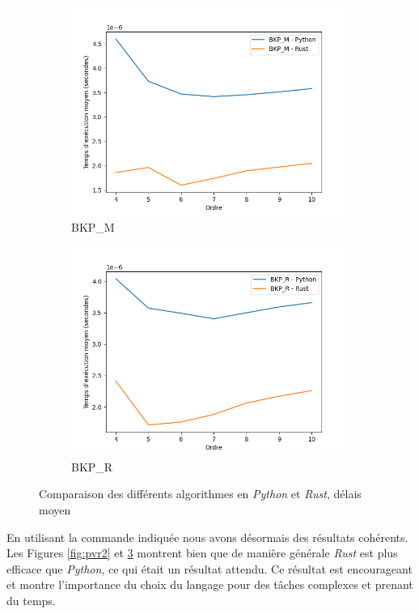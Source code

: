 \documentclass[12pt,a4paper]{article}
\begin{document}
\begin{figure}[ht]
\begin{subfigure}[b]{0.24\textwidth}
    \includegraphics[width=\textwidth]{images/delay_new_pyrust_BKP_M_plot.png}
  \caption{BKP\_M}%
  \label{subfig:pr2_delay_bkp_m}
  \end{subfigure}
  \begin{subfigure}[b]{0.24\textwidth}
    \includegraphics[width=\textwidth]{images/delay_new_pyrust_BKP_R_plot.png}
  \caption{BKP\_R}%
  \label{subfig:pr2_delay_bkp_r}
  \end{subfigure}
  \caption{Comparaison des différents algorithmes en \emph{Python} et \emph{Rust}, délais moyen}%
  \label{fig:pvr2_delay}
\end{figure}

En utilisant la commande indiquée nous avons désormais des résultats cohérents. Les Figures \ref{fig:pvr2} et \ref{fig:pvr2_delay} montrent bien que de manière générale \emph{Rust} est plus efficace que \emph{Python}, ce qui était un résultat attendu. Ce résultat est encourageant et montre l'importance du choix du langage pour des tâches complexes et prenant du temps.
\end{document}
